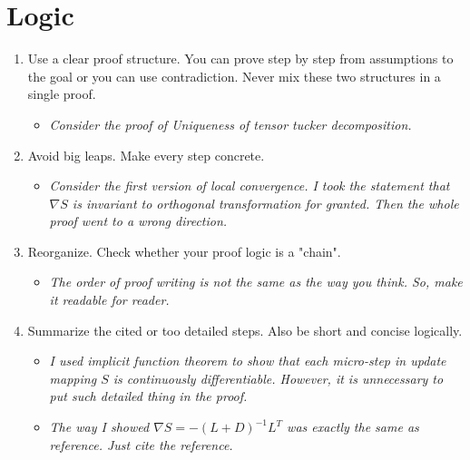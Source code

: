 \documentclass[11pt]{article}
\theoremstyle{plain}
\theoremstyle{definition}
\begin{document}
\section{Logic}
\begin{enumerate}
    \item Use a clear proof structure. You can prove step by step from assumptions to the goal or you can use contradiction. Never mix these two structures in a single proof. 
    \begin{itemize}
        \item \textit{Consider the proof of Uniqueness of tensor tucker decomposition.}
    \end{itemize}
    \item Avoid big leaps. Make every step concrete.
    \begin{itemize}
        \item \textit{Consider the first version of local convergence. I took the statement that $\nabla S$ is invariant to orthogonal transformation for granted. Then the whole proof went to a wrong direction.}
    \end{itemize}
    \item Reorganize. Check whether your proof logic is a "chain".
    \begin{itemize}
        \item \textit{The order of proof writing is not the same as the way you think. So, make it readable for reader.}
    \end{itemize}
    \item Summarize the cited or too detailed steps. Also be short and concise logically.
    \begin{itemize}
        \item \textit{ I used implicit function theorem to show that each micro-step in update mapping $S$ is continuously differentiable. However, it is unnecessary to put such detailed thing in the proof.}
        \item \textit{The way I showed $\nabla S = -(L+D)^{-1} L^T$ was exactly the same as reference. Just cite the reference. }
    \end{itemize}
\end{enumerate}
\end{document}
